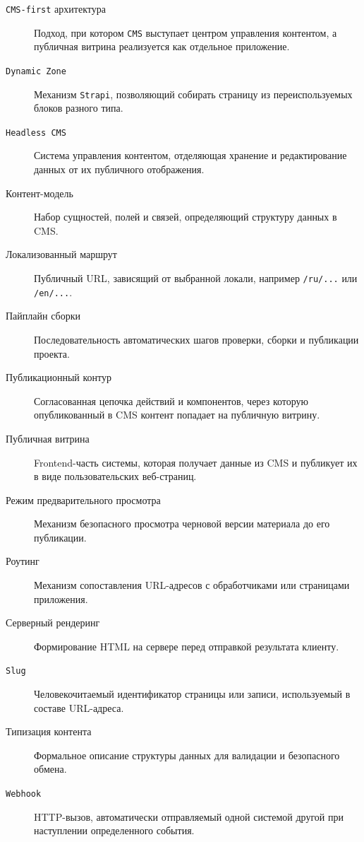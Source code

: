 \begin{description}
  \item[\texttt{CMS-first} архитектура] Подход, при котором \texttt{CMS} выступает центром управления контентом, а публичная витрина реализуется как отдельное приложение.
  \item[\texttt{Dynamic Zone}] Механизм \texttt{Strapi}, позволяющий собирать страницу из переиспользуемых блоков разного типа.
  \item[\texttt{Headless CMS}] Система управления контентом, отделяющая хранение и редактирование данных от их публичного отображения.
  \item[Контент-модель] Набор сущностей, полей и связей, определяющий структуру данных в CMS.
  \item[Локализованный маршрут] Публичный URL, зависящий от выбранной локали, например \texttt{/ru/...} или \texttt{/en/...}.
  \item[Пайплайн сборки] Последовательность автоматических шагов проверки, сборки и публикации проекта.
  \item[Публикационный контур] Согласованная цепочка действий и компонентов, через которую опубликованный в CMS контент попадает на публичную витрину.
  \item[Публичная витрина] Frontend-часть системы, которая получает данные из CMS и публикует их в виде пользовательских веб-страниц.
  \item[Режим предварительного просмотра] Механизм безопасного просмотра черновой версии материала до его публикации.
  \item[Роутинг] Механизм сопоставления URL-адресов с обработчиками или страницами приложения.
  \item[Серверный рендеринг] Формирование HTML на сервере перед отправкой результата клиенту.
  \item[\texttt{Slug}] Человекочитаемый идентификатор страницы или записи, используемый в составе URL-адреса.
  \item[Типизация контента] Формальное описание структуры данных для валидации и безопасного обмена.
  \item[\texttt{Webhook}] HTTP-вызов, автоматически отправляемый одной системой другой при наступлении определенного события.
\end{description}
